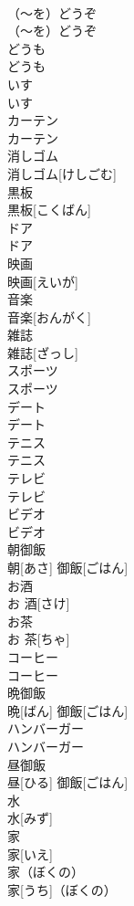 \documentclass[8pt]{extreport}
\begin{document}
\begin{CJK}{UTF8}{min}
\\	（〜を）どうぞ	
\\	（〜を）どうぞ
\\	どうも	
\\	どうも
\\	いす	
\\	いす
\\	カーテン	
\\	カーテン
\\	消しゴム	
\\	消しゴム[けしごむ]
\\	黒板	
\\	黒板[こくばん]
\\	ドア	
\\	ドア
\\	映画	
\\	映画[えいが]
\\	音楽	
\\	音楽[おんがく]
\\	雑誌	
\\	雑誌[ざっし]
\\	スポーツ	
\\	スポーツ
\\	デート	
\\	デート
\\	テニス	
\\	テニス
\\	テレビ	
\\	テレビ
\\	ビデオ	
\\	ビデオ
\\	朝御飯	
\\	朝[あさ] 御飯[ごはん]
\\	お酒	
\\	お 酒[さけ]
\\	お茶	
\\	お 茶[ちゃ]
\\	コーヒー	
\\	コーヒー
\\	晩御飯	
\\	晩[ばん] 御飯[ごはん]
\\	ハンバーガー	
\\	ハンバーガー
\\	昼御飯	
\\	昼[ひる] 御飯[ごはん]
\\	水	
\\	水[みず]
\\	家	
\\	家[いえ]
\\	家（ぼくの）	
\\	家[うち]（ぼくの）

\end{CJK}
\end{document}
